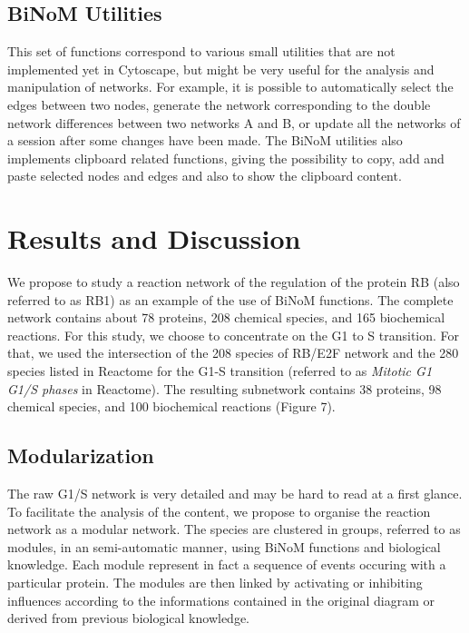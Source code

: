 \documentclass[10pt]{bmc_article}
\newenvironment{bmcformat}{\baselineskip20pt\sloppy\setboolean{publ}{false}}{\baselineskip20pt\sloppy}
\begin{document}
\begin{bmcformat}
\subsection*{BiNoM Utilities}
This set of functions correspond to various small utilities that are not
implemented yet in Cytoscape, but might be very useful for the analysis and
manipulation of networks. For example, it is possible to automatically select
the edges between two nodes, generate the network corresponding to the double
network differences between two networks A and B, or update all the networks of
a session after some changes have been made. The BiNoM utilities also implements
clipboard related functions, giving the possibility to copy, add and paste
selected nodes and edges and also to show the clipboard content. 


\section*{Results and Discussion}

We propose to study a reaction network of the regulation of the protein RB (also
referred to as RB1) \cite{calzone2008comprehensive} as an example of the use of
BiNoM functions. The complete network contains about 78 proteins, 208 chemical
species, and 165 biochemical reactions. For this study, we choose to concentrate
on the G1 to S transition. For that, we used the intersection of the 208 species
of RB/E2F network and the 280 species listed in Reactome for the G1-S transition
(referred to as \emph{Mitotic G1 G1/S phases} in Reactome). The resulting
subnetwork contains 38 proteins, 98 chemical species, and 100 biochemical
reactions (Figure 7).



\subsection*{Modularization} 

The raw G1/S network is very detailed and may be hard to read at a first glance.
To facilitate the analysis of the content, we propose to organise the reaction
network as a modular network. The species are clustered in groups, referred to
as modules, in an semi-automatic manner, using BiNoM functions and biological knowledge. Each module represent in fact a
sequence of events occuring with a particular protein. The modules are then
linked by activating or inhibiting influences according to the informations
contained in the original diagram or derived from previous biological knowledge.


\end{bmcformat}
\end{document}
